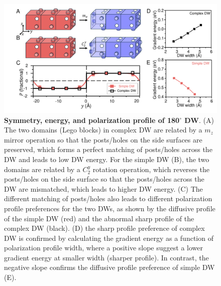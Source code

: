 \documentclass[12pt]{article}
\begin{document}
\begin{figure}
\begin{center}
  \includegraphics[scale=0.3]{Figure2.pdf}
  \caption{\textbf{Symmetry, energy, and polarization profile of 180$^\circ$ DW}. (A) The two domains (Lego blocks) in complex DW are related by a $m_z$ mirror operation so that the posts/holes on the side surfaces are preserved, which forms a perfect matching of posts/holes across the DW and leads to low DW energy. For the simple DW (B), the two domains are related by a $C_2^y$ rotation operation, which reverses the posts/holes on the side surface so that the posts/holes across the DW are mismatched, which leads to higher DW energy. (C) The different matching of posts/holes also leads to different polarization profile preferences for the two DWs, as shown by the diffusive profile of the simple DW (red) and the abnormal sharp profile of the complex DW (black). (D) the sharp profile preference of complex DW is confirmed by calculating the gradient energy as a function of polarization profile width, where a positive slope suggest a lower gradient energy at smaller width (sharper profile). In contrast, the negative slope confirms the diffusive profile preference of simple DW (E). }
  \label{figure2}
\end{center}
\end{figure}
\end{document}
